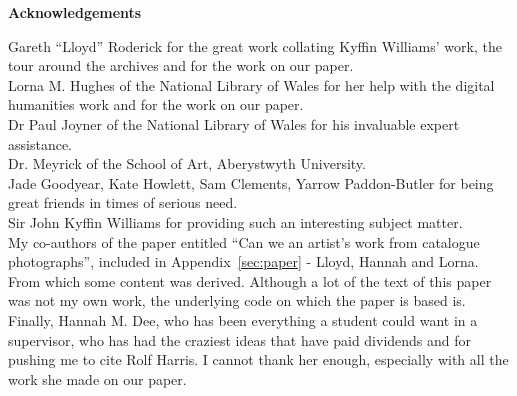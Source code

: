 \thispagestyle{empty}

\begin{center}
    {\LARGE\bf Acknowledgements}
\end{center}

Gareth ``Lloyd'' Roderick for the great work collating Kyffin Williams' work, the tour around the 
archives and for the work on our paper.\\

Lorna M. Hughes of the National Library of Wales for her help with the digital humanities work and
for the work on our paper.\\

Dr Paul Joyner of the National Library of Wales for his invaluable expert assistance.\\

Dr. Meyrick of the School of Art, Aberystwyth University.\\

Jade Goodyear, Kate Howlett, Sam Clements, Yarrow Paddon-Butler for being great friends
in times of serious need.\\

Sir John Kyffin Williams for providing such an interesting subject matter.\\

My co-authors of the paper entitled ``Can we an artist's work from catalogue photographs'', 
included in Appendix~\ref{sec:paper} - Lloyd, Hannah and Lorna. From which some content was 
derived. Although a lot of the text of this paper was not my own work, the underlying code on 
which the paper is based is.\\

Finally, Hannah M. Dee, who has been everything a student could want in a supervisor, who has had
the craziest ideas that have paid dividends and for pushing me to cite Rolf Harris. I cannot thank
her enough, especially with all the work she made on our paper.\\
